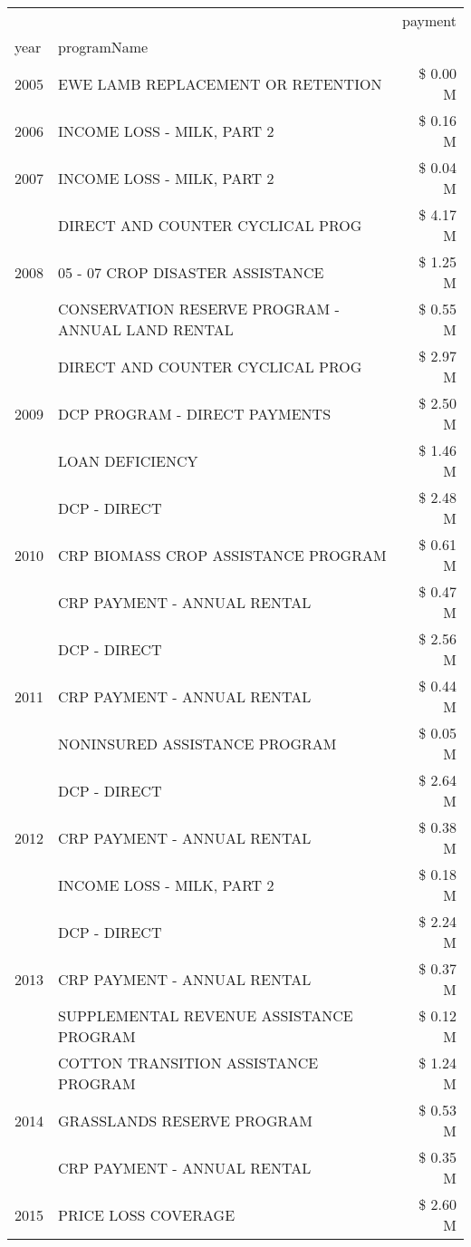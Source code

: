 \begin{tabular}{llr}
\toprule
 &  & payment \\
year & programName &  \\
\midrule
2005 & EWE LAMB REPLACEMENT OR RETENTION & \$ 0.00 M \\
\cline{1-3}
2006 & INCOME LOSS - MILK, PART 2 & \$ 0.16 M \\
\cline{1-3}
2007 & INCOME LOSS - MILK, PART 2 & \$ 0.04 M \\
\cline{1-3}
\multirow[t]{3}{*}{2008} & DIRECT AND COUNTER CYCLICAL PROG & \$ 4.17 M \\
 & 05 - 07 CROP DISASTER ASSISTANCE & \$ 1.25 M \\
 & CONSERVATION RESERVE PROGRAM - ANNUAL LAND RENTAL & \$ 0.55 M \\
\cline{1-3}
\multirow[t]{3}{*}{2009} & DIRECT AND COUNTER CYCLICAL PROG & \$ 2.97 M \\
 & DCP PROGRAM - DIRECT PAYMENTS & \$ 2.50 M \\
 & LOAN DEFICIENCY & \$ 1.46 M \\
\cline{1-3}
\multirow[t]{3}{*}{2010} & DCP - DIRECT & \$ 2.48 M \\
 & CRP BIOMASS CROP ASSISTANCE PROGRAM & \$ 0.61 M \\
 & CRP PAYMENT - ANNUAL RENTAL & \$ 0.47 M \\
\cline{1-3}
\multirow[t]{3}{*}{2011} & DCP - DIRECT & \$ 2.56 M \\
 & CRP PAYMENT - ANNUAL RENTAL & \$ 0.44 M \\
 & NONINSURED ASSISTANCE PROGRAM & \$ 0.05 M \\
\cline{1-3}
\multirow[t]{3}{*}{2012} & DCP - DIRECT & \$ 2.64 M \\
 & CRP PAYMENT - ANNUAL RENTAL & \$ 0.38 M \\
 & INCOME LOSS - MILK, PART 2 & \$ 0.18 M \\
\cline{1-3}
\multirow[t]{3}{*}{2013} & DCP - DIRECT & \$ 2.24 M \\
 & CRP PAYMENT - ANNUAL RENTAL & \$ 0.37 M \\
 & SUPPLEMENTAL REVENUE ASSISTANCE PROGRAM & \$ 0.12 M \\
\cline{1-3}
\multirow[t]{3}{*}{2014} & COTTON TRANSITION ASSISTANCE PROGRAM & \$ 1.24 M \\
 & GRASSLANDS RESERVE PROGRAM & \$ 0.53 M \\
 & CRP PAYMENT - ANNUAL RENTAL & \$ 0.35 M \\
\cline{1-3}
\multirow[t]{3}{*}{2015} & PRICE LOSS COVERAGE & \$ 2.60 M \\

\end{tabular}
